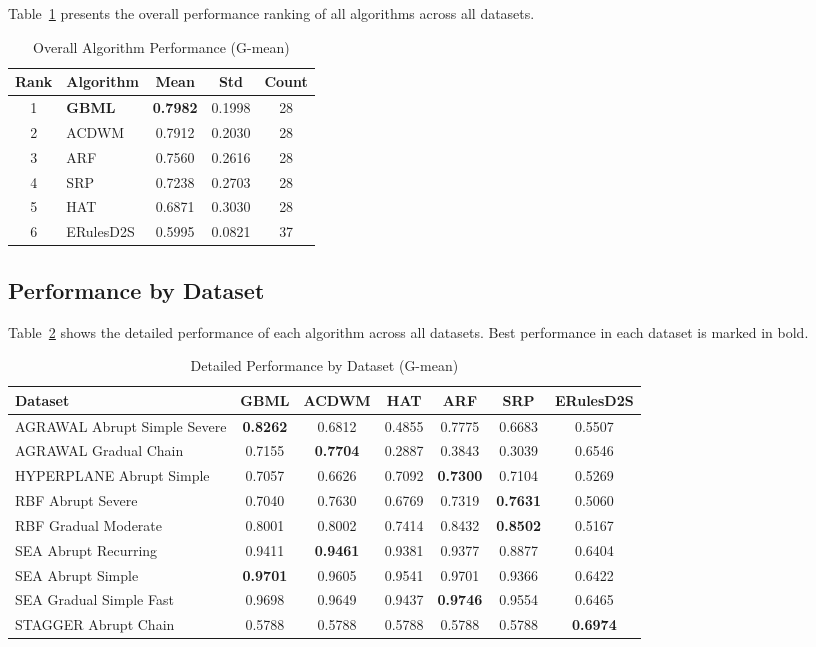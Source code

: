 \documentclass[conference]{IEEEtran}
\begin{document}
Table~\ref{tab:overall} presents the overall performance ranking of all algorithms across all datasets.

\begin{table}[htbp]
\caption{Overall Algorithm Performance (G-mean)}
\label{tab:overall}
\centering
\begin{tabular}{clccc}
\toprule
\textbf{Rank} & \textbf{Algorithm} & \textbf{Mean} & \textbf{Std} & \textbf{Count} \\
\midrule
1 & \textbf{GBML} & \textbf{0.7982} & 0.1998 & 28 \\
2 & ACDWM & 0.7912 & 0.2030 & 28 \\
3 & ARF & 0.7560 & 0.2616 & 28 \\
4 & SRP & 0.7238 & 0.2703 & 28 \\
5 & HAT & 0.6871 & 0.3030 & 28 \\
6 & ERulesD2S & 0.5995 & 0.0821 & 37 \\
\bottomrule
\end{tabular}
\end{table}

\subsection{Performance by Dataset}

Table~\ref{tab:bydata} shows the detailed performance of each algorithm across all datasets. Best performance in each dataset is marked in bold.

\begin{table}[htbp]
\caption{Detailed Performance by Dataset (G-mean)}
\label{tab:bydata}
\centering
\scriptsize
\setlength{\tabcolsep}{3pt}
\begin{tabular}{lcccccc}
\toprule
\textbf{Dataset} & \textbf{GBML} & \textbf{ACDWM} & \textbf{HAT} & \textbf{ARF} & \textbf{SRP} & \textbf{ERulesD2S} \\
\midrule
AGRAWAL Abrupt Simple Severe & \textbf{0.8262} & 0.6812 & 0.4855 & 0.7775 & 0.6683 & 0.5507 \\
AGRAWAL Gradual Chain & 0.7155 & \textbf{0.7704} & 0.2887 & 0.3843 & 0.3039 & 0.6546 \\
HYPERPLANE Abrupt Simple & 0.7057 & 0.6626 & 0.7092 & \textbf{0.7300} & 0.7104 & 0.5269 \\
RBF Abrupt Severe & 0.7040 & 0.7630 & 0.6769 & 0.7319 & \textbf{0.7631} & 0.5060 \\
RBF Gradual Moderate & 0.8001 & 0.8002 & 0.7414 & 0.8432 & \textbf{0.8502} & 0.5167 \\
SEA Abrupt Recurring & 0.9411 & \textbf{0.9461} & 0.9381 & 0.9377 & 0.8877 & 0.6404 \\
SEA Abrupt Simple & \textbf{0.9701} & 0.9605 & 0.9541 & 0.9701 & 0.9366 & 0.6422 \\
SEA Gradual Simple Fast & 0.9698 & 0.9649 & 0.9437 & \textbf{0.9746} & 0.9554 & 0.6465 \\
STAGGER Abrupt Chain & 0.5788 & 0.5788 & 0.5788 & 0.5788 & 0.5788 & \textbf{0.6974} \\
\bottomrule
\end{tabular}
\end{table}
\end{document}
